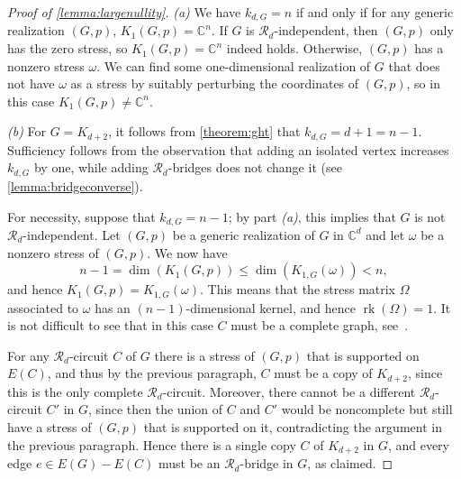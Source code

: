 \documentclass[11pt,a4paper,dvipsnames]{scrartcl}
\theoremstyle{definition}
\DeclareMathOperator{\rk}{rk}
\newcommand{\CC}{\mathbb{C}}
\newcommand{\stressnullity}[1]{k_{d, #1}}
\newcommand{\stresskernel}[2]{K_{{#1},{#2}}}
\begin{document}
\begin{proof}[Proof of \cref{lemma:largenullity}]
    \textit{(a)} We have $\stressnullity{G} = n$ if and only if for any generic realization $(G,p)$, $K_1(G,p) = \CC^n$. If $G$ is $\mathcal{R}_d$-independent, then $(G,p)$ only has the zero stress, so  $K_1(G,p) = \CC^n$ indeed holds. Otherwise, $(G,p)$ has a nonzero stress $\omega$. We can find some one-dimensional realization of $G$ that does not have $\omega$ as a stress by suitably perturbing the coordinates of $(G,p)$, so in this case $K_1(G,p) \neq \CC^n$.
    
    \textit{(b)} For $G = K_{d+2}$, it follows from \cref{theorem:ght} that $\stressnullity{G} = d+1 = n - 1$. Sufficiency follows from the observation that adding an isolated vertex increases $\stressnullity{G}$ by one, while adding $\mathcal{R}_d$-bridges does not change it (see \cref{lemma:bridgeconverse}).
    
    For necessity, suppose that $\stressnullity{G} = n-1$; by part \textit{(a)}, this implies that $G$ is not $\mathcal{R}_d$-independent. 
    Let $(G,p)$ be a generic realization of $G$ in $\CC^d$ and let $\omega$ be a nonzero stress of $(G,p)$. %
    We now have \[n-1 = \dim(K_1(G,p)) \leq \dim (\stresskernel{1}{G}(\omega)) < n,\] and hence $K_1(G,p) = \stresskernel{1}{G}(\omega)$. This means that the stress matrix $\Omega$ associated to $\omega$ has an $(n-1)$-dimensional kernel, and hence $\rk(\Omega) = 1$. It is not difficult to see that in this case $C$ must be a complete graph, see~\cite[Lemma 3.6]{garamvolgyi.jordan_2023}.
    
    For any $\mathcal{R}_d$-circuit $C$ of $G$ there is a stress of $(G,p)$ that is supported on $E(C)$, and thus by the previous paragraph, $C$ must be a copy of $K_{d+2}$, since this is the only complete $\mathcal{R}_d$-circuit. Moreover, there cannot be a different $\mathcal{R}_d$-circuit $C'$ in $G$, since then the union of $C$ and $C'$ would be noncomplete but still have a stress of $(G,p)$ that is supported on it, contradicting the argument in the previous paragraph. Hence there is a single copy $C$ of $K_{d+2}$ in $G$, and every edge $e \in E(G) - E(C)$ must be an $\mathcal{R}_d$-bridge in $G$, as claimed.
\end{proof}
\end{document}
